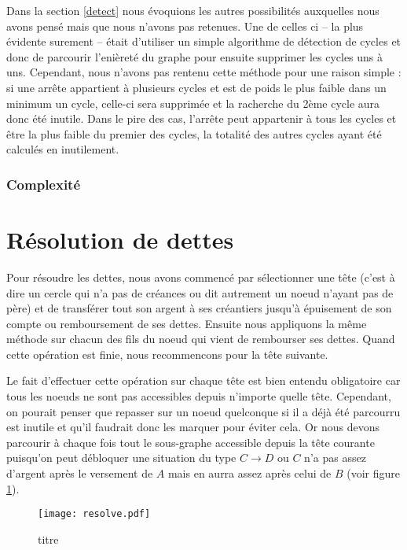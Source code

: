 \documentclass[12pt, oneside]{article}
\begin{document}
Dans la section \ref{detect} nous évoquions les autres possibilités auxquelles nous avons pensé mais que nous n'avons pas retenues. Une de celles ci -- la plus évidente surement -- était d'utiliser un simple algorithme de détection de cycles et donc de parcourir l'enièreté du graphe pour ensuite supprimer les cycles uns à uns. Cependant, nous n'avons pas rentenu cette méthode pour une raison simple : si une arrête appartient à plusieurs cycles et est de poids le plus faible dans un minimum un cycle, celle-ci sera supprimée et la racherche du 2ème cycle aura donc été inutile. Dans le pire des cas, l'arrête peut appartenir à tous les cycles et être la plus faible du premier des cycles, la totalité des autres cycles ayant été calculés en inutilement.



\subsubsection{Complexité}


\section{Résolution de dettes}
Pour résoudre les dettes, nous avons commencé par sélectionner une tête (c'est à dire un cercle qui n'a pas de créances ou dit autrement un noeud n'ayant pas de père) et de transférer tout son argent à ses créantiers jusqu'à épuisement de son compte ou remboursement de ses dettes. Ensuite nous appliquons la même méthode sur chacun des fils du noeud qui vient de rembourser ses dettes. Quand cette opération est finie, nous recommencons pour la tête suivante.

Le fait d'effectuer cette opération sur chaque tête est bien entendu obligatoire car tous les noeuds ne sont pas accessibles depuis n'importe quelle tête. Cependant, on pourait penser que repasser sur un noeud quelconque si il a déjà été parcourru est inutile et qu'il faudrait donc les marquer pour éviter cela. Or nous devons parcourir à chaque fois tout le sous-graphe accessible depuis la tête courante puisqu'on peut débloquer une situation du type $C \rightarrow D$ ou $C$ n'a pas assez d'argent après le versement de $A$ mais en aurra assez après celui de $B$ (voir figure \ref{resolve}).

\begin{figure}[h]
   \caption{\label{resolve} titre}
   \begin{center}
   \texttt{[image: resolve.pdf]}
   \end{center}
\end{figure}
\end{document}
